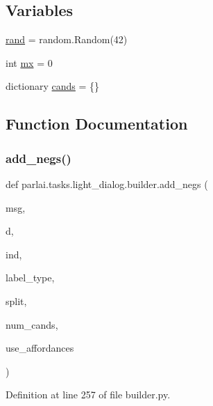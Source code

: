 \subsection*{Variables}
\begin{DoxyCompactItemize}
\item 
\hyperlink{namespaceparlai_1_1tasks_1_1light__dialog_1_1builder_a1a5f7c29e2ac62fb237eef07ae9815c1}{rand} = random.\+Random(42)
\item 
int \hyperlink{namespaceparlai_1_1tasks_1_1light__dialog_1_1builder_a3f89be6fdf88112fe7c566d593b3932c}{mx} = 0
\item 
dictionary \hyperlink{namespaceparlai_1_1tasks_1_1light__dialog_1_1builder_aaa9fd3ac19ed33a3e37093ffe025bbc0}{cands} = \{\}
\end{DoxyCompactItemize}


\subsection{Function Documentation}
\mbox{\label{namespaceparlai_1_1tasks_1_1light__dialog_1_1builder_a2f5cb4927740a90c9fba84df5e8e16b5}} 
\subsubsection{\texorpdfstring{add\+\_\+negs()}{add\_negs()}}
{\footnotesize\ttfamily def parlai.\+tasks.\+light\+\_\+dialog.\+builder.\+add\+\_\+negs (\begin{DoxyParamCaption}\item[{}]{msg,  }\item[{}]{d,  }\item[{}]{ind,  }\item[{}]{label\+\_\+type,  }\item[{}]{split,  }\item[{}]{num\+\_\+cands,  }\item[{}]{use\+\_\+affordances }\end{DoxyParamCaption})}



Definition at line 257 of file builder.\+py.



